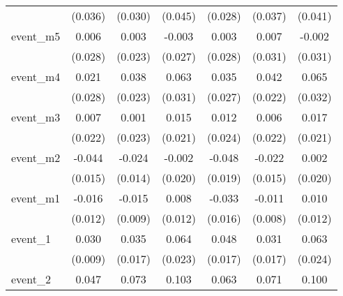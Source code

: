 {\begin{tabular}{l*{6}{c}}
            &     (0.036)         &     (0.030)         &     (0.045)         &     (0.028)         &     (0.037)         &     (0.041)         \\
[1em]
event\_m5    &       0.006         &       0.003         &      -0.003         &       0.003         &       0.007         &      -0.002         \\
            &     (0.028)         &     (0.023)         &     (0.027)         &     (0.028)         &     (0.031)         &     (0.031)         \\
[1em]
event\_m4    &       0.021         &       0.038         &       0.063\sym{*}  &       0.035         &       0.042         &       0.065\sym{*}  \\
            &     (0.028)         &     (0.023)         &     (0.031)         &     (0.027)         &     (0.022)         &     (0.032)         \\
[1em]
event\_m3    &       0.007         &       0.001         &       0.015         &       0.012         &       0.006         &       0.017         \\
            &     (0.022)         &     (0.023)         &     (0.021)         &     (0.024)         &     (0.022)         &     (0.021)         \\
[1em]
event\_m2    &      -0.044\sym{**} &      -0.024         &      -0.002         &      -0.048\sym{*}  &      -0.022         &       0.002         \\
            &     (0.015)         &     (0.014)         &     (0.020)         &     (0.019)         &     (0.015)         &     (0.020)         \\
[1em]
event\_m1    &      -0.016         &      -0.015         &       0.008         &      -0.033\sym{*}  &      -0.011         &       0.010         \\
            &     (0.012)         &     (0.009)         &     (0.012)         &     (0.016)         &     (0.008)         &     (0.012)         \\
[1em]
event\_1     &       0.030\sym{**} &       0.035\sym{*}  &       0.064\sym{**} &       0.048\sym{**} &       0.031         &       0.063\sym{**} \\
            &     (0.009)         &     (0.017)         &     (0.023)         &     (0.017)         &     (0.017)         &     (0.024)         \\
[1em]
event\_2     &       0.047\sym{*}  &       0.073\sym{***}&       0.103\sym{***}&       0.063\sym{**} &       0.071\sym{***}&       0.100\sym{***}\\

\end{tabular}}

